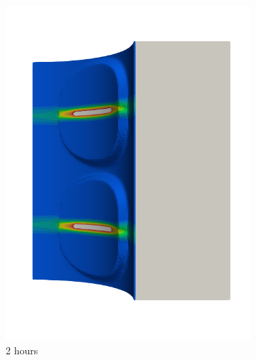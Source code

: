 \begin{figure}[!htb]
\begin{subfigure}[b]{0.2\textwidth}
    \includegraphics[width=\textwidth]{Chapter5/figures/spallation/seed_d_6}
    \caption{2 hours}
  \end{subfigure}
  \begin{subfigure}[b]{0.2\textwidth}
    \centering

\end{subfigure}
\end{figure}
